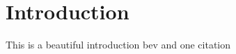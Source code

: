 \section{Introduction}\label{sec:introduction}

This is a beautiful introduction \acrshort{bev} and one citation \cite{zhang_dual-bev_2025}